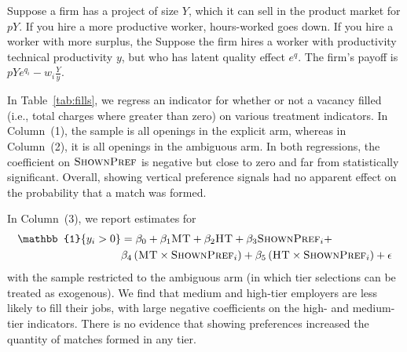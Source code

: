 Suppose a firm has a project of size $Y$, which it can sell in the product market for $pY$.
If you hire a more productive worker, hours-worked goes down.
If you hire a worker with more surplus, the
Suppose the firm hires a worker with productivity technical productivity $y$, but who has latent quality effect $e^q$.
The firm's payoff is $pYe^{q_i} - w_i \frac{Y}{y}$.


\appendix 

In Table~\ref{tab:fills}, we regress an indicator for whether or not a vacancy filled (i.e., total charges where greater than zero) on various treatment indicators. 
In Column~(1), the sample is all openings in the explicit arm, whereas in Column~(2), it is all openings in the ambiguous arm. 
In both regressions, the coefficient on $\textsc{ShownPref}$ is negative but close to zero and far from statistically significant. 
Overall, showing vertical preference signals had no apparent effect on the probability that a match was formed.



In Column~(3), we report estimates for
\begin{align} \label{eq:filli}
\mathbb{1}\{y_i > 0\} & = \beta_0 + \beta_1 \textsc{MT} + \beta_2 \textsc{HT} + \beta_3 \textsc{ShownPref}_i + \nonumber\\  
                      & \beta_4 \left(\textsc{MT} \times \textsc{ShownPref}_i \right) + \beta_5 \left(\textsc{HT} \times \textsc{ShownPref}_i\right) + \epsilon  
\end{align} 
with the sample restricted to the ambiguous arm (in which tier selections can be treated as exogenous).
We find that medium and high-tier employers are less likely to fill their jobs, with large negative coefficients on the high- and medium-tier indicators.
There is no evidence that showing preferences increased the quantity of matches formed in any tier. 

